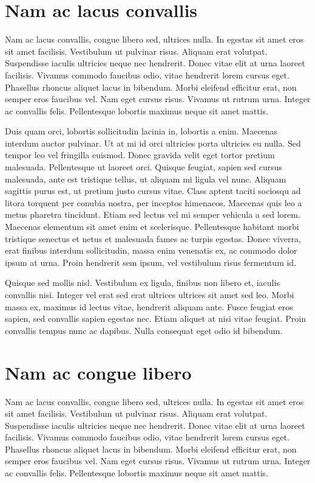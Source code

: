 \documentclass[a4paper,10pt]{book}
\begin{document}
\section{Nam ac lacus convallis}

Nam ac lacus convallis, congue libero sed, ultrices nulla. In egestas sit amet eros sit amet facilisis.
Vestibulum ut pulvinar risus. Aliquam erat volutpat. Suspendisse iaculis ultricies neque nec hendrerit.
Donec vitae elit at urna laoreet facilisis. Vivamus commodo faucibus odio, vitae hendrerit lorem cursus eget.
Phasellus rhoncus aliquet lacus in bibendum. Morbi eleifend efficitur erat, non semper eros faucibus vel.
Nam eget cursus risus. Vivamus ut rutrum urna. Integer ac convallis felis.
Pellentesque lobortis maximus neque sit amet mattis.

Duis quam orci, lobortis sollicitudin lacinia in, lobortis a enim. Maecenas interdum auctor pulvinar.
Ut at mi id orci ultricies porta ultricies eu nulla. Sed tempor leo vel fringilla euismod. Donec gravida velit
eget tortor pretium malesuada. Pellentesque ut laoreet orci. Quisque feugiat, sapien sed cursus malesuada,
ante est tristique tellus, ut aliquam mi ligula vel nunc. Aliquam sagittis purus est, ut pretium justo cursus vitae.
Class aptent taciti sociosqu ad litora torquent per conubia nostra, per inceptos himenaeos.
Maecenas quis leo a metus pharetra tincidunt. Etiam sed lectus vel mi semper vehicula a sed lorem.
Maecenas elementum sit amet enim et scelerisque.
Pellentesque habitant morbi tristique senectus et netus et malesuada fames ac turpis egestas.
Donec viverra, erat finibus interdum sollicitudin, massa enim venenatis ex, ac commodo dolor ipsum at urna.
Proin hendrerit sem ipsum, vel vestibulum risus fermentum id.

Quisque sed mollis nisl. Vestibulum ex ligula, finibus non libero et, iaculis convallis nisi.
Integer vel erat sed erat ultrices ultrices sit amet sed leo. Morbi massa ex, maximus id lectus vitae,
hendrerit aliquam ante. Fusce feugiat eros sapien, sed convallis sapien egestas nec. Etiam aliquet at
nisi vitae feugiat. Proin convallis tempus nunc ac dapibus. Nulla consequat eget odio id bibendum.

\section{Nam ac congue libero}

Nam ac lacus convallis, congue libero sed, ultrices nulla. In egestas sit amet eros sit amet facilisis.
Vestibulum ut pulvinar risus. Aliquam erat volutpat. Suspendisse iaculis ultricies neque nec hendrerit.
Donec vitae elit at urna laoreet facilisis. Vivamus commodo faucibus odio, vitae hendrerit lorem cursus eget.
Phasellus rhoncus aliquet lacus in bibendum. Morbi eleifend efficitur erat, non semper eros faucibus vel.
Nam eget cursus risus. Vivamus ut rutrum urna. Integer ac convallis felis.
Pellentesque lobortis maximus neque sit amet mattis.
\end{document}
